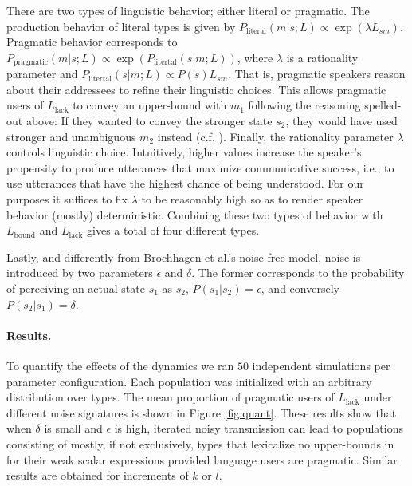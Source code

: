 \documentclass[10pt,a4paper]{article}
\begin{document}
There are two types of linguistic behavior; either literal or pragmatic. The production behavior of literal types is given by $P_{\text{literal}}(m|s;L) \propto \exp(\lambda L_{sm})$. Pragmatic behavior corresponds to $P_{\text{pragmatic}}(m|s;L) \propto \exp(P_{\text{litertal}}(s|m;L))$, where $\lambda$ is a rationality parameter and $P_{\text{litertal}}(s|m;L) \propto P(s) L_{sm}$. That is, pragmatic speakers reason about their addressees to refine their linguistic choices. This allows pragmatic users of $L_{\text{lack}}$ to convey an upper-bound with $m_1$ following the reasoning spelled-out above: If they wanted to convey the stronger state $s_2$, they would have used stronger and unambiguous $m_2$ instead (c.f. \citealt{frank+goodman:2012,franke+jaeger:2014}). Finally, the rationality parameter $\lambda$ controls linguistic choice. Intuitively, higher values increase the speaker's propensity to produce utterances that maximize communicative success, i.e., to use utterances that have the highest chance of being understood. For our purposes it suffices to fix $\lambda$ to be reasonably high so as to render speaker behavior (mostly) deterministic. Combining these two types of behavior with $L_{\text{bound}}$ and $L_{\text{lack}}$ gives a total of four different types.

Lastly, and differently from Brochhagen et al.'s noise-free model, noise is introduced by two parameters $\epsilon$ and $\delta$. The former corresponds to the probability of perceiving an actual state $s_1$ as $s_2$, $P(s_1 | s_2) = \epsilon$, and conversely $P(s_2 | s_1) = \delta$.

\paragraph{Results.} To quantify the effects of the dynamics we ran $50$ independent simulations per parameter configuration. Each population was initialized with an arbitrary distribution over types. The mean proportion of pragmatic users of $L_{\text{lack}}$ under different noise signatures is shown in Figure \ref{fig:quant}. These results show that when $\delta$ is small and $\epsilon$ is high, iterated noisy transmission can lead to populations consisting of mostly, if not exclusively, types that lexicalize no upper-bounds in for their weak scalar expressions provided language users are pragmatic.  Similar results are obtained for increments of $k$ or $l$. 
\end{document}
